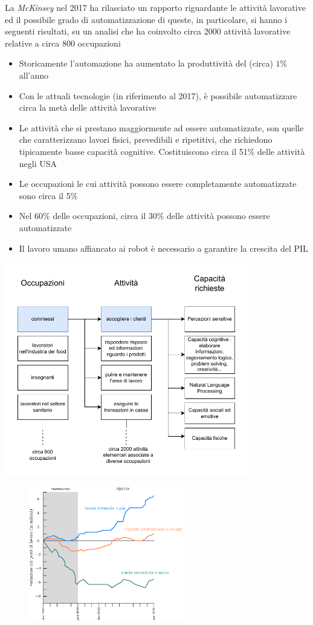 \documentclass[10pt, letterpaper]{report}
\begin{document}
La \textit{McKinsey} nel 2017 ha rilasciato un rapporto riguardante le attività lavorative ed il possibile 
grado di automatizzazione di queste, in particolare, si hanno i seguenti risultati, su un analisi che ha coinvolto 
circa 2000 attività lavorative relative a circa 800 occupazioni\begin{itemize}
    \item Storicamente l'automazione ha aumentato la produttività del (circa) $1\%$ all'anno
    \item Con le attuali tecnologie (in riferimento al 2017), è possibile automatizzare circa la metà delle 
    attività lavorative 
    \item Le attività che si prestano maggiormente ad essere automatizzate, son quelle che caratterizzano lavori 
    fisici, prevedibili e ripetitivi, che richiedono tipicamente basse capacità cognitive. Costituiscono circa 
    il 51\% delle attività negli USA
    \item Le occupazioni le cui attività possono essere completamente automatizzate sono circa il 5\% 
    \item Nel 60\% delle occupazioni, circa il 30\% delle attività possono essere automatizzate
    \item Il lavoro umano affiancato ai robot è necessario a garantire la crescita del PIL
\end{itemize}\begin{center}
    \includegraphics[width=0.8\textwidth ]{images/attivitaAutomatizzabili.pdf}
\end{center}\begin{figure}[h!]
    \centering
    \includegraphics[width=0.6\textwidth ]{images/andamentoLavori.eps}

\end{figure}
\end{document}
